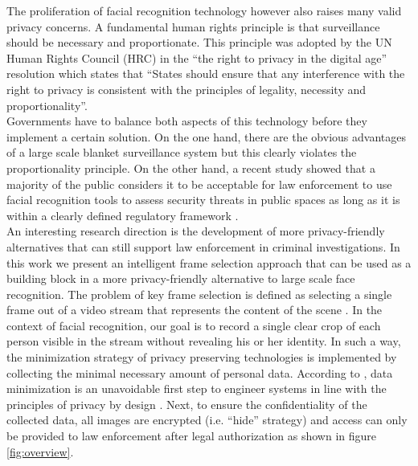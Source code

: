 \documentclass[letterpaper]{article} %
\begin{document}
The proliferation of facial recognition technology however also raises many valid privacy concerns. A fundamental human rights principle is that surveillance should be necessary and proportionate. This principle was adopted by the UN Human Rights Council (HRC) in the ``the right to privacy in the digital age'' resolution which states that ``States should ensure that any interference with the right to privacy is consistent with the principles of legality, necessity and proportionality''\cite{unitednations}.
\\
\newline
Governments have to balance both aspects of this technology before they implement a certain solution. On the one hand, there are the obvious advantages of a large scale blanket surveillance system but this clearly violates the proportionality principle. On the other hand, a recent study showed that a majority of the public considers it to be acceptable for law enforcement to use facial recognition tools to assess security threats in public spaces as long as it is within a clearly defined regulatory framework \cite{smith2019more}.
\\
An interesting research direction is the development of more privacy-friendly alternatives that can still support law enforcement in criminal investigations. In this work we present an intelligent frame selection approach that can be used as a building block in a more privacy-friendly alternative to large scale face recognition. The problem of key frame selection is defined as selecting a single frame out of a video stream that represents the content of the scene \cite{wolf1996key}. In the context of facial recognition, our goal is to record a single clear crop of each person visible in the stream without revealing his or her identity. In such a way, the minimization strategy of privacy preserving technologies \cite{DomingoFerrer2020} is implemented by collecting the minimal necessary amount of personal data.
According to \cite{duncan2007engineering}, data minimization is an unavoidable first step to engineer systems in line with the principles of privacy by design \cite{cavoukian2009privacy}. Next, to ensure the confidentiality of the collected data, all images are encrypted (i.e. ``hide'' strategy) and access can only be provided to law enforcement after legal authorization as shown in figure \ref{fig:overview}.
\end{document}
